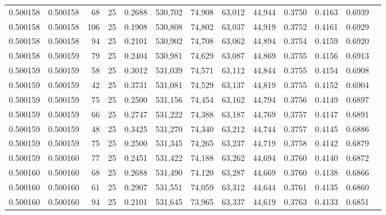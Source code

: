 \begin{tabular}{rrrrrrrrrrrrr}
0.500158 & 0.500158 &    68 &  25 &                                     0.2688 & 530,702 &  74,908 &  63,012 &  44,944 & 0.3750 & 0.4163 & 0.6939 \\
0.500158 & 0.500158 &   106 &  25 &                                     0.1908 & 530,808 &  74,802 &  63,037 &  44,919 & 0.3752 & 0.4161 & 0.6929 \\
0.500158 & 0.500158 &    94 &  25 &                                     0.2101 & 530,902 &  74,708 &  63,062 &  44,894 & 0.3754 & 0.4159 & 0.6920 \\
0.500158 & 0.500159 &    79 &  25 &                                     0.2404 & 530,981 &  74,629 &  63,087 &  44,869 & 0.3755 & 0.4156 & 0.6913 \\
0.500159 & 0.500159 &    58 &  25 &                                     0.3012 & 531,039 &  74,571 &  63,112 &  44,844 & 0.3755 & 0.4154 & 0.6908 \\
0.500159 & 0.500159 &    42 &  25 &                                     0.3731 & 531,081 &  74,529 &  63,137 &  44,819 & 0.3755 & 0.4152 & 0.6904 \\
0.500159 & 0.500159 &    75 &  25 &                                     0.2500 & 531,156 &  74,454 &  63,162 &  44,794 & 0.3756 & 0.4149 & 0.6897 \\
0.500159 & 0.500159 &    66 &  25 &                                     0.2747 & 531,222 &  74,388 &  63,187 &  44,769 & 0.3757 & 0.4147 & 0.6891 \\
0.500159 & 0.500159 &    48 &  25 &                                     0.3425 & 531,270 &  74,340 &  63,212 &  44,744 & 0.3757 & 0.4145 & 0.6886 \\
0.500159 & 0.500159 &    75 &  25 &                                     0.2500 & 531,345 &  74,265 &  63,237 &  44,719 & 0.3758 & 0.4142 & 0.6879 \\
0.500159 & 0.500160 &    77 &  25 &                                     0.2451 & 531,422 &  74,188 &  63,262 &  44,694 & 0.3760 & 0.4140 & 0.6872 \\
0.500160 & 0.500160 &    68 &  25 &                                     0.2688 & 531,490 &  74,120 &  63,287 &  44,669 & 0.3760 & 0.4138 & 0.6866 \\
0.500160 & 0.500160 &    61 &  25 &                                     0.2907 & 531,551 &  74,059 &  63,312 &  44,644 & 0.3761 & 0.4135 & 0.6860 \\
0.500160 & 0.500160 &    94 &  25 &                                     0.2101 & 531,645 &  73,965 &  63,337 &  44,619 & 0.3763 & 0.4133 & 0.6851 \\

\end{tabular}

